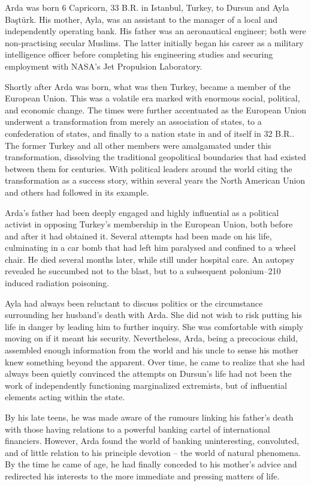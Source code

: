 Arda was born 6 Capricorn, 33 B.R. in Istanbul, Turkey, to Dursun and Ayla Baştürk. His mother, Ayla, was an assistant to the manager of a local and independently operating bank. His father was an aeronautical engineer; both were non-practising secular Muslims. The latter initially began his career as a military intelligence officer before completing his engineering studies and securing employment with NASA's Jet Propulsion Laboratory.

Shortly after Arda was born, what was then Turkey, became a member of the European Union. This was a volatile era marked with enormous social, political, and economic change. The times were further accentuated as the European Union underwent a transformation from merely an association of states, to a confederation of states, and finally to a nation state in and of itself in 32 B.R.. The former Turkey and all other members were amalgamated under this transformation, dissolving the traditional geopolitical boundaries that had existed between them for centuries. With political leaders around the world citing the transformation as a success story, within several years the North American Union and others had followed in its example.

Arda's father had been deeply engaged and highly influential as a political activist in opposing Turkey's membership in the European Union, both before and after it had obtained it. Several attempts had been made on his life, culminating in a car bomb that had left him paralysed and confined to a wheel chair. He died several months later, while still under hospital care. An autopsy revealed he succumbed not to the blast, but to a subsequent polonium--210 induced radiation poisoning.

Ayla had always been reluctant to discuss politics or the circumstance surrounding her husband's death with Arda. She did not wish to risk putting his life in danger by leading him to further inquiry. She was comfortable with simply moving on if it meant his security. Nevertheless, Arda, being a precocious child, assembled enough information from the world and his uncle to sense his mother knew something beyond the apparent. Over time, he came to realize that she had always been quietly convinced the attempts on Dursun's life had not been the work of independently functioning marginalized extremists, but of influential elements acting within the state.

By his late teens, he was made aware of the rumours linking his father's death with those having relations to a powerful banking cartel of international financiers. However, Arda found the world of banking uninteresting, convoluted, and of little relation to his principle devotion -- the world of natural phenomena. By the time he came of age, he had finally conceded to his mother's advice and redirected his interests to the more immediate and pressing matters of life.

